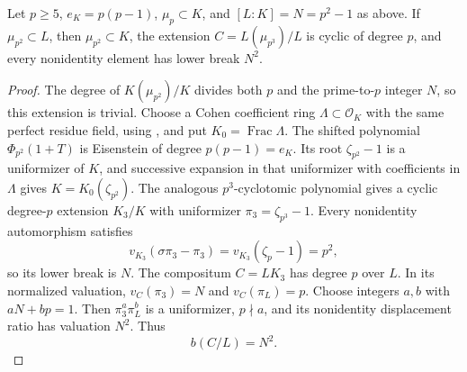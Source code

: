 \begin{lemma}\label{lem:first-wild-cyclotomic-break}
Let $p\ge5$, $e_K=p(p-1)$, $\mu_p\subset K$, and $[L:K]=N=p^2-1$ as above. If $\mu_{p^2}\subset L$, then $\mu_{p^2}\subset K$, the extension $C=L(\mu_{p^3})/L$ is cyclic of degree $p$, and every nonidentity element has lower break $N^2$.
\end{lemma}
\begin{proof}
The degree of $K(\mu_{p^2})/K$ divides both $p$ and the prime-to-$p$ integer $N$, so this extension is trivial.
Choose a Cohen coefficient ring $\Lambda\subset\mathcal O_K$ with the same perfect residue field, using \citet[Theorem~10.160.8, Tag~032A]{StacksCohen}, and put $K_0=\operatorname{Frac}\Lambda$. The shifted polynomial $\Phi_{p^2}(1+T)$ is Eisenstein of degree $p(p-1)=e_K$. Its root $\zeta_{p^2}-1$ is a uniformizer of $K$, and successive expansion in that uniformizer with coefficients in $\Lambda$ gives $K=K_0(\zeta_{p^2})$. The analogous $p^3$-cyclotomic polynomial gives a cyclic degree-$p$ extension $K_3/K$ with uniformizer $\pi_3=\zeta_{p^3}-1$. Every nonidentity automorphism satisfies
\[
 v_{K_3}(\sigma\pi_3-\pi_3)=v_{K_3}(\zeta_p-1)=p^2,
\]
so its lower break is $N$. The compositum $C=LK_3$ has degree $p$ over $L$. In its normalized valuation, $v_C(\pi_3)=N$ and $v_C(\pi_L)=p$. Choose integers $a,b$ with $aN+bp=1$. Then $\pi_3^a\pi_L^b$ is a uniformizer, $p\nmid a$, and its nonidentity displacement ratio has valuation $N^2$. Thus
\begin{equation}\label{eq:general-cyclotomic-last-break}
                   b(C/L)=N^2.
\end{equation}

\end{proof}

